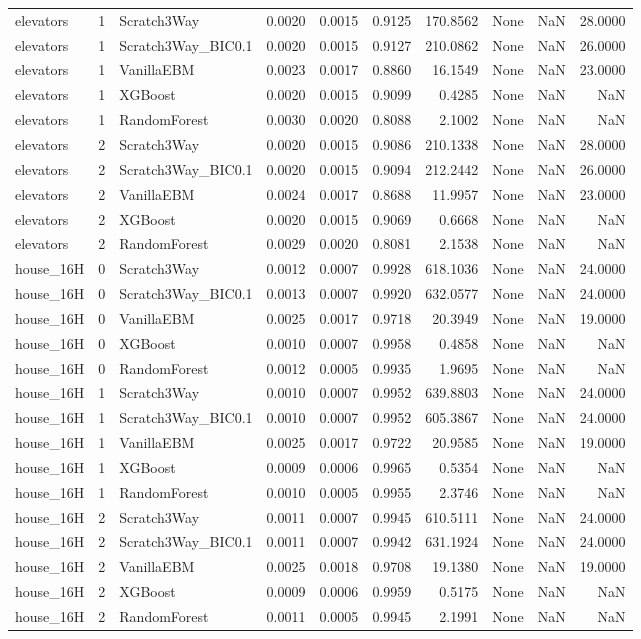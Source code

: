 \begin{tabular}{lrlrrrrlrr}
elevators & 1 & Scratch3Way & 0.0020 & 0.0015 & 0.9125 & 170.8562 & None & NaN & 28.0000 \\
elevators & 1 & Scratch3Way_BIC0.1 & 0.0020 & 0.0015 & 0.9127 & 210.0862 & None & NaN & 26.0000 \\
elevators & 1 & VanillaEBM & 0.0023 & 0.0017 & 0.8860 & 16.1549 & None & NaN & 23.0000 \\
elevators & 1 & XGBoost & 0.0020 & 0.0015 & 0.9099 & 0.4285 & None & NaN & NaN \\
elevators & 1 & RandomForest & 0.0030 & 0.0020 & 0.8088 & 2.1002 & None & NaN & NaN \\
elevators & 2 & Scratch3Way & 0.0020 & 0.0015 & 0.9086 & 210.1338 & None & NaN & 28.0000 \\
elevators & 2 & Scratch3Way_BIC0.1 & 0.0020 & 0.0015 & 0.9094 & 212.2442 & None & NaN & 26.0000 \\
elevators & 2 & VanillaEBM & 0.0024 & 0.0017 & 0.8688 & 11.9957 & None & NaN & 23.0000 \\
elevators & 2 & XGBoost & 0.0020 & 0.0015 & 0.9069 & 0.6668 & None & NaN & NaN \\
elevators & 2 & RandomForest & 0.0029 & 0.0020 & 0.8081 & 2.1538 & None & NaN & NaN \\
house_16H & 0 & Scratch3Way & 0.0012 & 0.0007 & 0.9928 & 618.1036 & None & NaN & 24.0000 \\
house_16H & 0 & Scratch3Way_BIC0.1 & 0.0013 & 0.0007 & 0.9920 & 632.0577 & None & NaN & 24.0000 \\
house_16H & 0 & VanillaEBM & 0.0025 & 0.0017 & 0.9718 & 20.3949 & None & NaN & 19.0000 \\
house_16H & 0 & XGBoost & 0.0010 & 0.0007 & 0.9958 & 0.4858 & None & NaN & NaN \\
house_16H & 0 & RandomForest & 0.0012 & 0.0005 & 0.9935 & 1.9695 & None & NaN & NaN \\
house_16H & 1 & Scratch3Way & 0.0010 & 0.0007 & 0.9952 & 639.8803 & None & NaN & 24.0000 \\
house_16H & 1 & Scratch3Way_BIC0.1 & 0.0010 & 0.0007 & 0.9952 & 605.3867 & None & NaN & 24.0000 \\
house_16H & 1 & VanillaEBM & 0.0025 & 0.0017 & 0.9722 & 20.9585 & None & NaN & 19.0000 \\
house_16H & 1 & XGBoost & 0.0009 & 0.0006 & 0.9965 & 0.5354 & None & NaN & NaN \\
house_16H & 1 & RandomForest & 0.0010 & 0.0005 & 0.9955 & 2.3746 & None & NaN & NaN \\
house_16H & 2 & Scratch3Way & 0.0011 & 0.0007 & 0.9945 & 610.5111 & None & NaN & 24.0000 \\
house_16H & 2 & Scratch3Way_BIC0.1 & 0.0011 & 0.0007 & 0.9942 & 631.1924 & None & NaN & 24.0000 \\
house_16H & 2 & VanillaEBM & 0.0025 & 0.0018 & 0.9708 & 19.1380 & None & NaN & 19.0000 \\
house_16H & 2 & XGBoost & 0.0009 & 0.0006 & 0.9959 & 0.5175 & None & NaN & NaN \\
house_16H & 2 & RandomForest & 0.0011 & 0.0005 & 0.9945 & 2.1991 & None & NaN & NaN \\
\bottomrule
\end{tabular}
